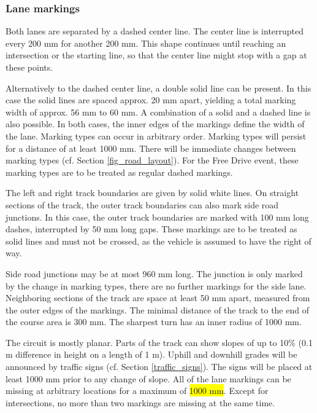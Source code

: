 \subsubsection{Lane markings}
\label{lane_markings}

Both lanes are separated by a dashed center line. The center line is
interrupted every 200 mm for another 200 mm. This shape continues until
reaching an intersection or the starting line, so that the center line might
stop with a gap at these points.

Alternatively to the dashed center line, a double solid line can be present. In
this case the solid lines are spaced approx. 20 mm apart, yielding a total
marking width of approx. 56 mm to 60 mm. A combination of a solid and a dashed
line is also possible. In both cases, the inner edges of the markings define
the width of the lane. Marking types can occur in arbitrary order. Marking
types will persist for a distance of at least 1000 mm. There will be immediate
changes between marking types (cf. Section \ref{fig_road_layout}). For the Free
Drive event, these marking types are to be treated as regular dashed markings.

The left and right track boundaries are given by solid white lines. On straight
sections of the track, the outer track boundaries can also mark side road
junctions. In this case, the outer track boundaries are marked with 100 mm long
dashes, interrupted by 50 mm long gaps. These markings are to be treated as
solid lines and must not be crossed, as the vehicle is assumed to have the
right of way.

Side road junctions may be at most 960 mm long. The junction is only marked by
the change in marking types, there are no further markings for the side lane.
Neighboring sections of the track are space at least 50 mm apart, measured from
the outer edges of the markings. The minimal distance of the track to the end
of the course area is 300 mm. The sharpest turn has an inner radius of 1000 mm.

The circuit is mostly planar. Parts of the track can show slopes of up to 10\%
(0.1 m difference in height on a length of 1 m). Uphill and downhill grades
will be announced by traffic signs (cf. Section \ref{traffic_signs}). The signs
will be placed at least 1000 mm prior to any change of slope. All of the lane
markings can be missing at arbitrary locations for a maximum of
\colorbox{yellow}{1000 mm}. Except for intersections, no more than two markings
are missing at the same time.

